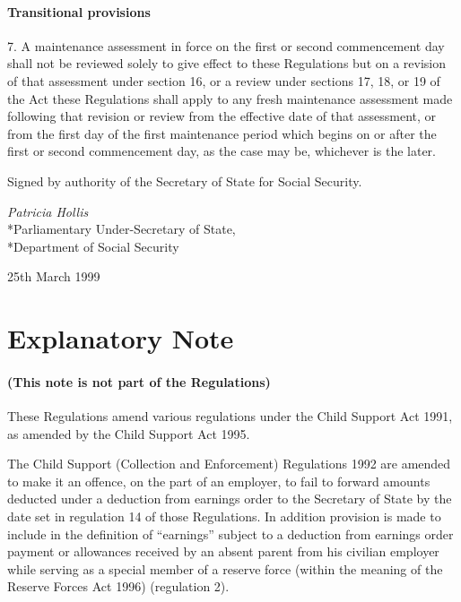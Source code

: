 \documentclass[12pt,a4paper]{article}
\begin{document}
\subsection[7. Transitional provisions]{Transitional provisions}

7.  A maintenance assessment in force on the first or second commencement day shall not be reviewed solely to give effect to these Regulations but on a revision of that assessment under section 16, or a review under sections 17, 18, or 19 of the Act these Regulations shall apply to any fresh maintenance assessment made following that revision or review from the effective date of that assessment, or from the first day of the first maintenance period which begins on or after the first or second commencement day, as the case may be, whichever is the later.

\bigskip

Signed 
by authority of the Secretary of State for Social Security.

{\raggedleft
\emph{Patricia Hollis}\\*Parliamentary Under-Secretary of State,\\*Department of Social Security

}

25th March 1999

\small

\part{Explanatory Note}

\renewcommand\parthead{--- Explanatory Note}

\subsection*{(This note is not part of the Regulations)}

These Regulations amend various regulations under the Child Support Act 1991, as amended by the Child Support Act 1995.

\begin{sloppypar}
  The Child Support (Collection and Enforcement) Regulations 1992 are amended to make it an offence, on the part of an employer, to fail to forward amounts deducted under a deduction from earnings order to the Secretary of State by the date set in regulation 14 of those Regulations. In addition provision is made to include in the definition of “earnings” subject to a deduction from earnings order payment or allowances received by an absent parent from his civilian employer while serving as a special member of a reserve force (within the meaning of the Reserve Forces Act 1996) (regulation 2).
\end{sloppypar}
\end{document}
